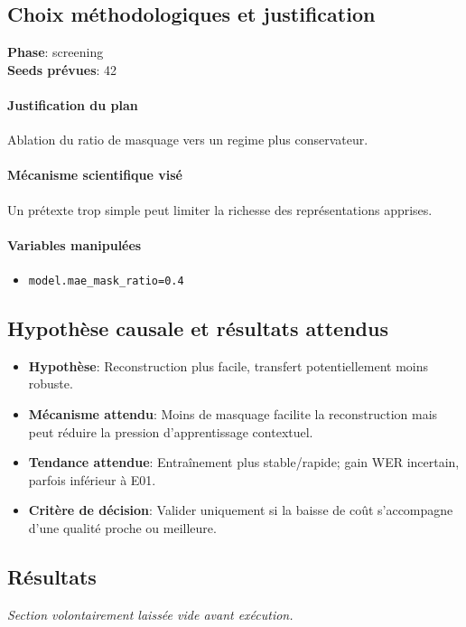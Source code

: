 \documentclass[11pt,a4paper]{article}
\begin{document}
\subsection{Choix méthodologiques et justification}
\textbf{Phase}: screening\\
\textbf{Seeds prévues}: 42\\


\paragraph{Justification du plan}
Ablation du ratio de masquage vers un regime plus conservateur.

\paragraph{Mécanisme scientifique visé}
Un prétexte trop simple peut limiter la richesse des représentations apprises.

\paragraph{Variables manipulées}
\begin{itemize}
\item \texttt{model.mae\_mask\_ratio=0.4}
\end{itemize}

\subsection{Hypothèse causale et résultats attendus}
\begin{itemize}[leftmargin=1.2cm]
\item \textbf{Hypothèse}: Reconstruction plus facile, transfert potentiellement moins robuste.
\item \textbf{Mécanisme attendu}: Moins de masquage facilite la reconstruction mais peut réduire la pression d'apprentissage contextuel.
\item \textbf{Tendance attendue}: Entraînement plus stable/rapide; gain WER incertain, parfois inférieur à E01.
\item \textbf{Critère de décision}: Valider uniquement si la baisse de coût s'accompagne d'une qualité proche ou meilleure.
\end{itemize}

\subsection{Résultats}
\textit{Section volontairement laissée vide avant exécution.}
\end{document}
